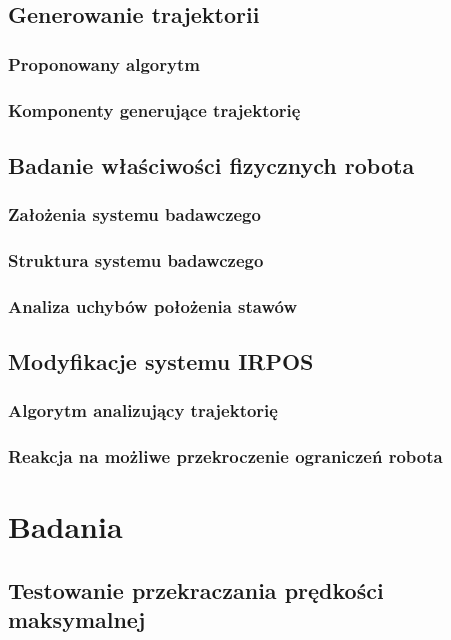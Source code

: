 \documentclass[11pt, a4paper, openright]{report}
\begin{document}
	\section{Generowanie trajektorii}
	\label{s:traj_gen}
		\subsection{Proponowany algorytm}
		\label{ss:traj_gen_teoria}
		\subsection{Komponenty generujące trajektorię}
		\label{ss:traj_gen_components}
	\section{Badanie właściwości fizycznych robota}
	\label{s:badanie_ograniczen}
		\subsection{Założenia systemu badawczego}
		\label{ss:zalozenia_systemu_badawczego}
		\subsection{Struktura systemu badawczego}
		\label{ss:struktura_systemu_badawczego}
		\subsection{Analiza uchybów położenia stawów}
		\label{ss:obsluga_stanow_krytycznych}
	\section{Modyfikacje systemu IRPOS}
	\label{s:mod_irpos}
		\subsection{Algorytm analizujący trajektorię}
		\label{ss:traj_analiza}
		\subsection{Reakcja na możliwe przekroczenie ograniczeń robota}
		\label{ss:lqr}

\chapter{Badania}
\label{ch:badania}
	\section{Testowanie przekraczania prędkości maksymalnej}
	\label{s:testowanie_przekraczania_prędkości_maksymalnej}
\end{document}
